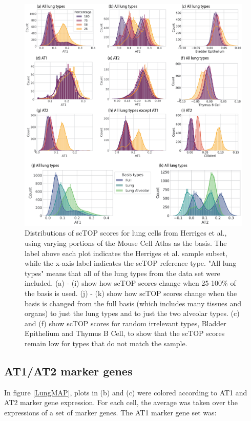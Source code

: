 \documentclass[aps,superscriptaddress, notitlepage,longbibliography]{revtex4-1}
\begin{document}
\begin{figure}
	\centering
		\includegraphics[scale=0.82]{figs/robustness hists.png}
	\caption{Distributions of scTOP scores for lung cells from Herriges et al., using varying portions of the Mouse Cell Atlas as the basis. The label above each plot indicates the Herriges et al. sample subset, while the x-axis label indicates the scTOP reference type. "All lung types" means that all of the lung types from the data set were included. (a) - (i) show how scTOP scores change when 25-100\% of the basis is used. (j) - (k) show how scTOP scores change when the basis is changed from the full basis (which includes many tissues and organs) to just the lung types and to just the two alveolar types. (c) and (f) show scTOP scores for random irrelevant types, Bladder Epithelium and Thymus B Cell, to show that the scTOP scores remain low for types that do not match the sample.}
	\label{robustness hists}
\end{figure}

\subsection{AT1/AT2 marker genes}\label{alveolar markers}
In figure \ref{LungMAP}, plots in (b) and (c) were colored according to AT1 and AT2 marker gene expression. For each cell, the average was taken over the expressions of a set of marker genes. The AT1 marker gene set was:
\end{document}
